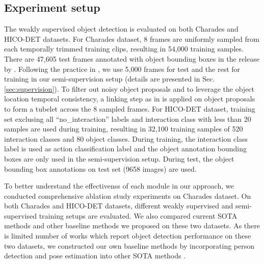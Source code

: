 \subsection{Experiment setup}
The weakly supervised object detection is evaluated on both Charades and HICO-DET datasets. For Charades dataset, 8 frames are uniformly sampled from each temporally trimmed training clips, resulting in 54,000 training samples. There are 47,605 test frames annotated with object bounding boxes in the release by \cite{yuan2017temporal}. Following the practice in \cite{yuan2017temporal}, we use 5,000 frames for test and the rest for training in our semi-supervision setup (details are presented in Sec. \ref{sec:supervision}). To filter out noisy object proposals and to leverage the object location temporal consistency, a linking step as in \cite{gkioxari2015finding} is applied on object proposals to form a tubelet across the 8 sampled frames. For HICO-DET dataset, training set exclusing all ``no\_interaction'' labels and interaction class with less than 20 samples are used during training, resulting in 32,100 training samples of 520 interaction classes and 80 object classes. During training, the interaction class label is used as action classification label and the object annotation bounding boxes are only used in the semi-supervision setup. During test, the object bounding box annotations on test set (9658 images) are used.

To better understand the effectivenss of each module in our approach, we conducted comprehensive ablation study experiments on Charades dataset. On both Charades and HICO-DET datasets, different weakly supervised and semi-supervised training setups are evaluated. We also compared current SOTA methods and other baseline methods we proposed on these two datasets. As there is limited number of works which report object detection performance on these two datasets, we constructed our own baseline methods by incorporating person detection and pose estimation into other SOTA methods \cite{gkioxari2015finding,bilen2016weakly}. 

